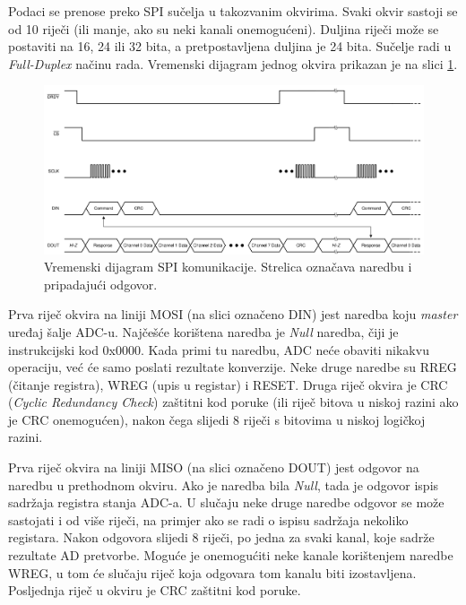             Podaci se prenose preko SPI sučelja u takozvanim okvirima. Svaki okvir sastoji se od 10 riječi (ili manje, ako su neki kanali onemogućeni). Duljina riječi može se postaviti na 16, 24 ili 32 bita, a pretpostavljena duljina je 24 bita. Sučelje radi u \textit{Full-Duplex} načinu rada. Vremenski dijagram jednog okvira prikazan je na slici \ref{fig:ads131m08_spi_vremenski_dijagram}.

            \begin{figure}[htb]
                \centering
                \includegraphics[width=\textwidth]{slike/ads131m08_spi_vremenski_dijagram.png}
                \caption{Vremenski dijagram SPI komunikacije. Strelica označava naredbu i pripadajući odgovor. \cite{ads131m08_datasheet}}
                \label{fig:ads131m08_spi_vremenski_dijagram}
            \end{figure}

            Prva riječ okvira na liniji MOSI (na slici označeno DIN) jest naredba koju \textit{master} uređaj šalje ADC-u. Najčešće korištena naredba je \textit{Null} naredba, čiji je instrukcijski kod 0x0000. Kada primi tu naredbu, ADC neće obaviti nikakvu operaciju, već će samo poslati rezultate konverzije. Neke druge naredbe su RREG (čitanje registra), WREG (upis u registar) i RESET. Druga riječ okvira je CRC (\textit{Cyclic Redundancy Check}) zaštitni kod poruke (ili riječ bitova u niskoj razini ako je CRC onemogućen), nakon čega slijedi 8 riječi s bitovima u niskoj logičkoj razini.

            Prva riječ okvira na liniji MISO (na slici označeno DOUT) jest odgovor na naredbu u prethodnom okviru. Ako je naredba bila \textit{Null}, tada je odgovor ispis sadržaja registra stanja ADC-a. U slučaju neke druge naredbe odgovor se može sastojati i od više riječi, na primjer ako se radi o ispisu sadržaja nekoliko registara. Nakon odgovora slijedi 8 riječi, po jedna za svaki kanal, koje sadrže rezultate AD pretvorbe. Moguće je onemogućiti neke kanale korištenjem naredbe WREG, u tom će slučaju riječ koja odgovara tom kanalu biti izostavljena. Posljednja riječ u okviru je CRC zaštitni kod poruke.
            
